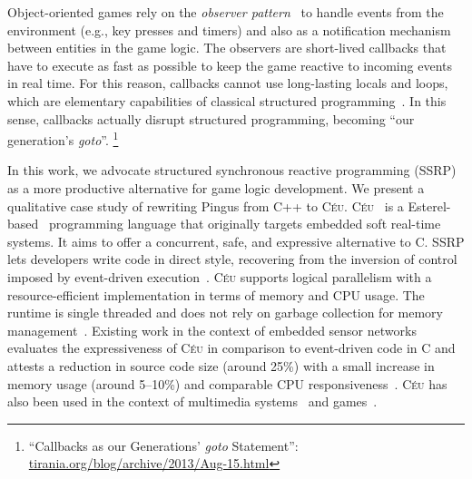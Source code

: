 \documentclass[10pt, conference, compsocconf]{IEEEtran}
\newcommand{\CEU}{\textsc{C\'{e}u}\xspace}
\begin{document}
Object-oriented games rely on the \emph{observer pattern}~\cite{games.patterns}
to handle events from the environment (e.g., key presses and timers) and also
as a notification mechanism between entities in the game logic.
%
The observers are short-lived callbacks that have to execute as fast as
possible to keep the game reactive to incoming events in real time.
%
For this reason, callbacks cannot use long-lasting locals and loops, which are
elementary capabilities of classical structured
programming~\cite{rp.deprecating,rp.rescala,sync_async.cooperative}.
%
In this sense, callbacks actually disrupt structured programming, becoming
``our generation's \emph{goto}''.%
\footnote{``Callbacks as our Generations' \emph{goto} Statement'':
\url{tirania.org/blog/archive/2013/Aug-15.html}}

In this work, we advocate structured synchronous reactive programming (SSRP) as
a more productive alternative for game logic development.
We present a qualitative case study of rewriting Pingus from C++ to \CEU.
%
\CEU~\cite{ceu.tecs17} is a Esterel-based~\cite{esterel.ieee91}
programming language that originally targets embedded soft real-time systems.
It aims to offer a concurrent, safe, and expressive alternative to C.
%
SSRP lets developers write code in direct style, recovering from the inversion
of control imposed by event-driven
execution~\cite{rp.deprecating,rp.rescala,sync_async.cooperative}.
%
%
\CEU supports logical parallelism with a resource-efficient implementation in
terms of memory and CPU usage.
The runtime is single threaded and does not rely on garbage collection for
memory management~\cite{ceu.sensys13}.
%
Existing work in the context of embedded sensor networks evaluates the
expressiveness of \CEU in comparison to event-driven code in C and attests a
reduction in source code size (around 25\%) with a small increase in memory
usage (around 5--10\%) and comparable CPU responsiveness~\cite{ceu.sensys13}.
%
\CEU has also been used in the context of multimedia
systems~\cite{ceumedia.webmedia16} and games~\cite{ceu.mod15}.
\end{document}
